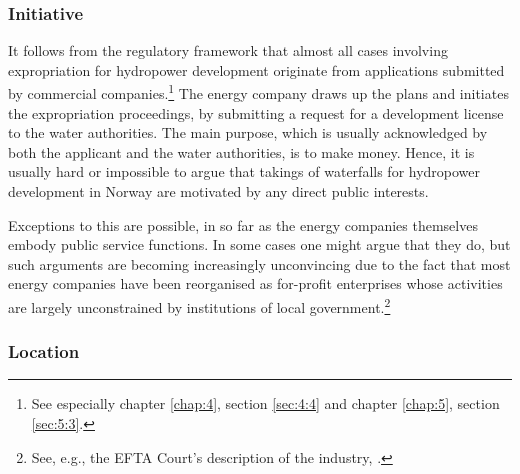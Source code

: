 \subsubsection{Initiative}\label{sec:5:7:3}

It follows from the regulatory framework that almost all cases involving expropriation for hydropower development originate from applications submitted by commercial companies.\footnote{See especially chapter \ref{chap:4}, section \ref{sec:4:4} and chapter \ref{chap:5}, section \ref{sec:5:3}.} The energy company draws up the plans and initiates the expropriation proceedings, by submitting a request for a development license to the water authorities. The main purpose, which is usually acknowledged by both the applicant and the water authorities, is to make money. Hence, it is usually hard or impossible to argue that takings of waterfalls for hydropower development in Norway are motivated by any direct public interests. %

Exceptions to this are possible, in so far as the energy companies themselves embody public service functions. In some cases one might argue that they do, but such arguments are becoming increasingly unconvincing due to the fact that most energy companies have been reorganised as for-profit enterprises whose activities are largely unconstrained by institutions of local government.\footnote{See, e.g., the EFTA Court's description of the industry, \cite{efta07}.}

\subsubsection{Location}\label{sec:5:7:4}

